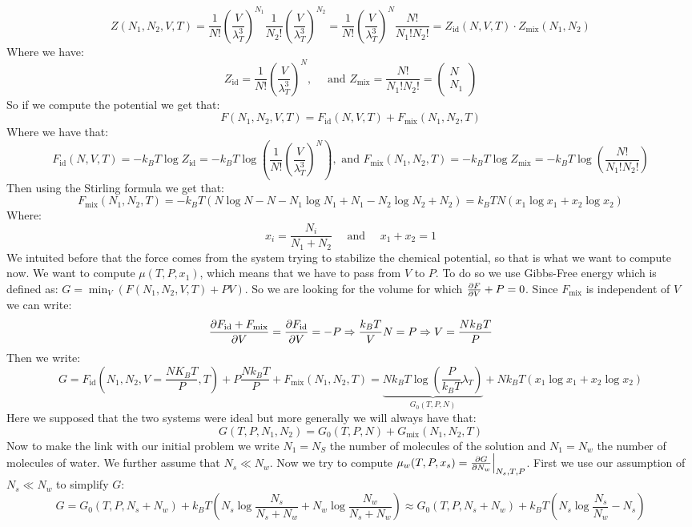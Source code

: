 \documentclass[10pt,a4paper]{book}
\begin{document}
\[
Z(N_1, N_2, V, T) = \frac{1}{N!}\left(\frac{V}{\lambda^3_T}\right)^{N_1} \frac{1}{N_2 !} \left( \frac{V}{\lambda^3_T}\right)^{N_2} = \frac{1}{N!}\left(\frac{V}{\lambda^3_T}\right)^N\frac{N!}{N_1 ! N_2 !} = Z_{\text{id}}(N, V, T) \cdot Z_\text{mix}(N_1, N_2)
\]
Where we have:
\[
Z_\text{id} = \frac{1}{N!} \left(\frac{V}{\lambda^3_T}\right)^N, \quad \text{ and } Z_\text{mix} = \frac{N!}{N_1!N_2!} = \begin{pmatrix}N\\N_1\end{pmatrix}
\]
So if we compute the potential we get that:
\[
F(N_1, N_2, V, T) = F_\text{id}(N, V, T) + F_\text{mix}(N_1, N_2, T)
\]
Where we have that:
\[
F_\text{id}(N, V, T) = - k_B T \log Z_\text{id} = - k_B T \log(\frac{1}{N!} \left(\frac{V}{\lambda^3_T}\right)^N), \text{ and } F_\text{mix}(N_1, N_2, T) = - k_B T \log Z_\text{mix} = -k_B T \log(\frac{N!}{N_1!N_2!})
\]
Then using the Stirling formula we get that:
\[
F_\text{mix}(N_1, N_2, T) = -k_B T \left( N\log N - N - N_1 \log N_1 + N_1 - N_2 \log N_2 + N_2 \right) = k_B T N (x_1 \log x_1 + x_2 \log x_2) 
\]
Where:
\[
x_i = \frac{N_i}{N_1 + N_2} \quad \text{ and } \quad x_1 + x_2 = 1
\]
We intuited before that the force comes from the system trying to stabilize the chemical potential, so that is what we want to compute now. We want to compute $\mu (T, P, x_1)$, which means that we have to pass from $V$ to $P$. To do so we use Gibbs-Free energy which is defined as: $G = \min_V (F(N_1, N_2, V, T) + PV)$. So we are looking for the volume for which $ \pdv{F}{V} + P = 0$. Since $F_\text{mix}$ is independent of $V$ we can write:
\[
\pdv{F_\text{id} + F_\text{mix}}{V} = \pdv{F_\text{id}}{V} = - P \Rightarrow \frac{k_B T}{V}N = P \Rightarrow V = \frac{N k_B T}{P}
\]
Then we write:
\[
G = F_\text{id}(N_1, N_2, V = \frac{N K_B T}{P}, T) + P \frac{N k_B T}{P} + F_\text{mix}(N_1, N_2, T) = \underbrace{Nk_B T \log (\frac{P}{k_B T} \lambda_T)}_{G_0 (T, P, N)} + Nk_B T (x_1 \log x_1 + x_2 \log x_2)
\]
Here we supposed that the two systems were ideal but more generally we will always have that:
\[
G(T, P, N_1, N_2) = G_0 (T, P, N) + G_\text{mix} (N_1, N_2, T)
\]
Now to make the link with our initial problem we write $N_1 = N_S$ the number of molecules of the solution and $N_1 = N_w$ the number of molecules of water. We further assume that $N_s \ll N_w$. Now we try to compute $\mu_w(T, P, x_s) = \pdv{G}{N_w}\Big|_{N_s, T, P}$. First we use our assumption of $N_s \ll N_w$ to simplify $G$:
\[
G = G_0(T, P, N_s + N_w) + k_B T \left(N_s \log \frac{N_s}{N_s + N_w} + N_w \log \frac{N_w}{N_s + N_w}\right) \approx G_0(T, P, N_s + N_w) + k_B T \left( N_s \log \frac{N_s}{N_w} - N_s \right)
\]
\end{document}
